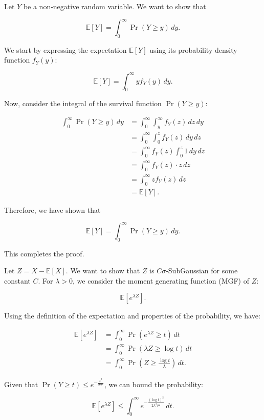 \documentclass[a4 paper]{article}
\theoremstyle{boldStyle}
\theoremstyle{boldBlueStyle}
\theoremstyle{boldPurpleStyle}
\theoremstyle{boldRedStyle}
\begin{document}
\bigbreak


Let \(Y\) be a non-negative random variable. We want to show that

\[
\mathbb{E}[Y] = \int_0^\infty \Pr(Y \geq y) \, dy.
\]

We start by expressing the expectation \(\mathbb{E}[Y]\) using its probability density function \(f_Y(y)\):

\[
\mathbb{E}[Y] = \int_0^\infty y f_Y(y) \, dy.
\]

Now, consider the integral of the survival function \(\Pr(Y \geq y)\):

\begin{align*}
\int_0^\infty \Pr(Y \geq y) \, dy &= \int_0^\infty \int_y^\infty f_Y(z) \, dz \, dy \\
&= \int_0^\infty \int_0^z f_Y(z) \, dy \, dz \\
&= \int_0^\infty f_Y(z) \int_0^z 1 \, dy \, dz \\
&= \int_0^\infty f_Y(z) \cdot z \, dz \\
&= \int_0^\infty z f_Y(z) \, dz \\
&= \mathbb{E}[Y].
\end{align*}

Therefore, we have shown that

\[
\mathbb{E}[Y] = \int_0^\infty \Pr(Y \geq y) \, dy.
\]

This completes the proof.



Let \(Z = X - \mathbb{E}[X]\). We want to show that \(Z\) is \(C\sigma\)-SubGaussian for some constant \(C\). For \(\lambda > 0\), we consider the moment generating function (MGF) of \(Z\):

\[
\mathbb{E}[e^{\lambda Z}].
\]

Using the definition of the expectation and properties of the probability, we have:

\begin{align*}
\mathbb{E}[e^{\lambda Z}] &= \int_0^\infty \Pr(e^{\lambda Z} \geq t) \, dt \\
&= \int_0^\infty \Pr(\lambda Z \geq \log t) \, dt \\
&= \int_0^\infty \Pr\left(Z \geq \frac{\log t}{\lambda}\right) \, dt.
\end{align*}

Given that \(\Pr(Y \geq t) \leq e^{-\frac{t^2}{2\sigma^2}}\), we can bound the probability:

\[
\mathbb{E}[e^{\lambda Z}] \leq \int_0^\infty e^{-\frac{(\log t)^2}{2\lambda^2 \sigma^2}} \, dt.
\]
\end{document}
